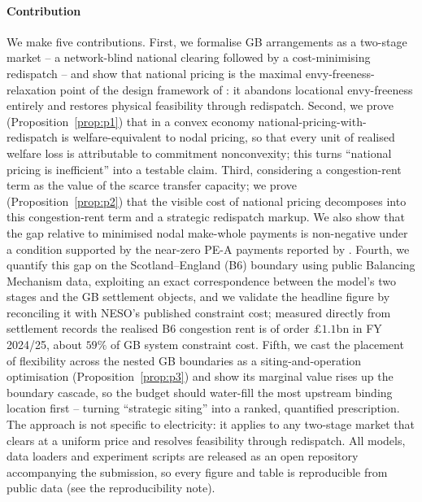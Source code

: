 \documentclass[review,3p,times]{elsarticle}
\theoremstyle{plain}
\theoremstyle{definition}
\begin{document}
\paragraph{Contribution} We make five contributions.
First, we formalise GB arrangements as a two-stage market -- a network-blind
national clearing followed by a cost-minimising redispatch -- and show that
national pricing is the maximal envy-freeness-relaxation point of the design
framework of \citet{bichler2022}: it abandons locational envy-freeness entirely and
restores physical feasibility through redispatch. Second, we prove
(Proposition~\ref{prop:p1}) that in a convex economy
national-pricing-with-redispatch is welfare-equivalent to nodal pricing, so that
every unit of realised welfare loss is attributable to commitment nonconvexity;
this turns ``national pricing is inefficient'' into a testable claim.
Third, considering a congestion-rent term as the value of the scarce
transfer capacity; we prove (Proposition~\ref{prop:p2}) that the visible cost of national
pricing decomposes into this congestion-rent term and a strategic
redispatch markup. We also show that the gap relative to minimised nodal make-whole
payments is non-negative under a condition supported by the near-zero PE-A
payments reported by \citet{bichler2022}. Fourth, we quantify this gap on the
Scotland--England (B6) boundary using public Balancing Mechanism data, exploiting
an exact correspondence between the model's two stages and the GB settlement
objects, and we validate the headline figure by reconciling it with NESO's
published constraint cost; measured directly from settlement records the realised
B6 congestion rent is of order $\pounds1.1$bn in FY 2024/25, about $59\%$ of GB
system constraint cost. Fifth, we cast the placement of flexibility across the
nested GB boundaries as a siting-and-operation optimisation
(Proposition~\ref{prop:p3}) and show its marginal value rises up the boundary
cascade, so the budget should water-fill the most upstream binding location
first -- turning ``strategic siting'' into a ranked, quantified prescription. The
approach is not specific to electricity: it
applies to any two-stage market that clears at a uniform price and resolves
feasibility through redispatch. All models, data loaders and experiment scripts
are released as an open repository accompanying the submission, so every figure
and table is reproducible from public data (see the reproducibility note).

\end{document}
